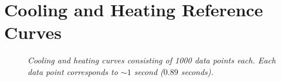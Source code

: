\documentclass[10pt]{article}
\begin{document}
\section{Cooling and Heating Reference Curves} \label{app:short_data}
\begin{figure}[h!]
    \centering
    \qquad
    \caption{\it{Cooling and heating curves consisting of 1000 data points each. Each data point corresponds to $\sim 1$ second ($0.89$ seconds). }}%
    \label{fig:heat_and_cool_curve}%
\end{figure}
\end{document}
